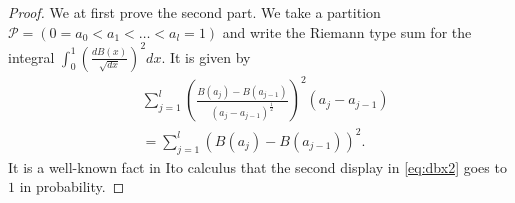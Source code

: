 \documentclass[10pt,a4paper]{amsart}
\begin{document}
\begin{proof}
We at first prove the second part. We take a partition $\mathcal{P}=(0=a_{0}<a_{1}<\ldots< a_{l}=1)$ and write the Riemann type sum for the integral $\int_{0}^{1} \left( \frac{dB(x)}{\sqrt{dx}} \right)^{2} dx$. It is given by 
\begin{equation}\label{eq:dbx2}
\begin{split}
&\sum_{j=1}^{l} \left(\frac{B(a_{j})-B(a_{j-1})}{(a_{j}-a_{j-1})^{\frac{1}{2}}}\right)^{2}(a_{j}-a_{j-1})\\
&= \sum_{j=1}^{l} \left(B(a_{j}) - B(a_{j-1}) \right)^2.
\end{split}
\end{equation}
It is a well-known fact in Ito calculus that the second display in \eqref{eq:dbx2} goes to $1$ in probability.


\end{proof}
\end{document}
